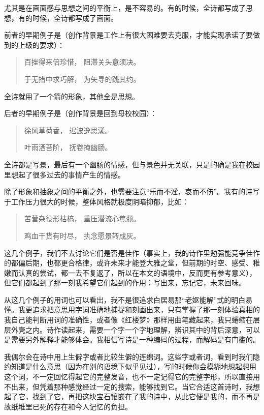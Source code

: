 \documentclass{article}
\begin{document}
尤其是在画面感与思想之间的平衡上，是不容易的。有的时候，全诗都写成了思想，有的时候，全诗都写成了画面。

前者的早期例子是（创作背景是工作上有很大困难要去克服，才能实现承诺了要做到的上级的要求）：

\begin{quote}
百挫得来倍珍惜， 阻滞关头意须决。

于无措中求巧解， 为矢寻的践其约。
\end{quote}

全诗就用了一个箭的形象，其他全是思想。

后者的早期例子是（创作背景是回到母校校园）：

\begin{quote}
徐风草荷香， 迟波逸思漾。

叶雨洒苔阶， 抚卷掩幽肠。
\end{quote}

全诗都是写景，最后有一个幽肠的情感，但与景色并无关联，只是的确是我在校园里想起了很多过去的事情产生的情感。

除了形象和抽象之间的平衡之外，也需要注意``乐而不淫，哀而不伤''。我有的诗写于工作压力很大的时候，整体风格就极度阴暗抑郁，比如：

\begin{quote}
苦营杂役形枯槁， 重压潜流心焦颓。

鸡血干货有时尽， 执念愿景转成灰。
\end{quote}

这几个例子，我们不去讨论它们是否是佳作（事实上，我的诗作里勉强能竞争佳作的都偏后期，也都更合格律，或许未来才能登大雅之堂，但前期的时空、感受、稚嫩而认真的尝试，都一去不复返了，所以在本文的语境中，反而更有参考意义），但它们都起到了那一刻我希望它们起到的作用：写出来，忘记它，未来回味。

从这几个例子的用词也可以看出，我不是很追求白居易那``老妪能解''式的明白易懂。我更追求把意思用字词准确地捕捉和刻画出来，只有掌握了那一刻体验真相的我自己能判断用词的准确性，或者像《红楼梦》那样用曲笔藏起来，我只蜷缩在层层外壳之内。诗作读起来，需要一个字一个字地理解，辨识其中的背后深意，可以是需要另外解释才能够体会。我相信写诗是一种编码的过程，而解码是有门槛的。

我偶尔会在诗中用上生僻字或者比较生僻的连绵词。这些字或者词，看到时我们隐约知道是什么意思（因为在别的语境下似乎见过），写的时候你会模糊地想起想用这个词，不一定回忆得起它的完整发音，也不一定记得它的完整字形，所以直接用不出来，但凭着那种感觉经过一定的搜索，能够找到它。当它合适这首诗时，我想起了它，找到了它，再把这块宝石镶嵌在了我的诗中，从此它便是我的，而不再是故纸堆里已死的存在和今人记忆的负担。
\end{document}
